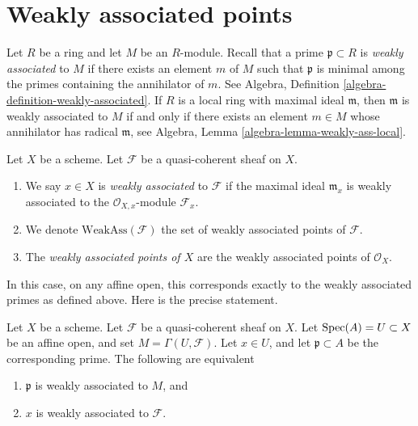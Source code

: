 \section{Weakly associated points}
\label{section-weakly-associated}

\noindent
Let $R$ be a ring and let $M$ be an $R$-module.
Recall that a prime $\mathfrak p \subset R$ is {\it weakly associated}
to $M$ if there exists an element $m$ of $M$ such that $\mathfrak p$ is
minimal among the primes containing the annihilator of $m$. See
Algebra, Definition \ref{algebra-definition-weakly-associated}.
If $R$ is a local ring with maximal ideal $\mathfrak m$, then
$\mathfrak m$ is weakly associated to $M$ if and only if there exists an
element $m \in M$ whose annihilator has radical $\mathfrak m$, see
Algebra, Lemma \ref{algebra-lemma-weakly-ass-local}.

\begin{definition}
\label{definition-weakly-associated}
Let $X$ be a scheme.
Let $\mathcal{F}$ be a quasi-coherent sheaf on $X$.
\begin{enumerate}
\item We say $x \in X$ is {\it weakly associated} to $\mathcal{F}$
if the maximal ideal $\mathfrak m_x$ is weakly associated to the
$\mathcal{O}_{X, x}$-module $\mathcal{F}_x$.
\item We denote $\text{WeakAss}(\mathcal{F})$ the set of weakly associated
points of $\mathcal{F}$.
\item The {\it weakly associated points of $X$} are the weakly associated
points of $\mathcal{O}_X$.
\end{enumerate}
\end{definition}

\noindent
In this case, on any affine open, this corresponds exactly to the
weakly associated primes as defined above. Here is the precise statement.

\begin{lemma}
\label{lemma-weakly-associated-affine-open}
Let $X$ be a scheme. Let $\mathcal{F}$ be a quasi-coherent sheaf on $X$.
Let $\mathop{\mathrm{Spec}}(A) = U \subset X$ be an affine open, and set
$M = \Gamma(U, \mathcal{F})$.
Let $x \in U$, and let $\mathfrak p \subset A$ be the corresponding prime.
The following are equivalent
\begin{enumerate}
\item $\mathfrak p$ is weakly associated to $M$, and
\item $x$ is weakly associated to $\mathcal{F}$.
\end{enumerate}
\end{lemma}

